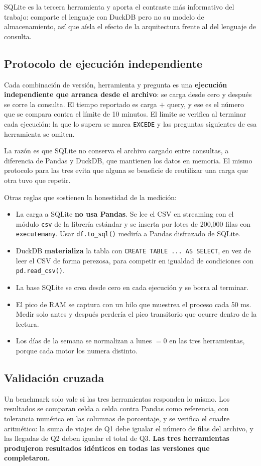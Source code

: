 SQLite es la tercera herramienta y aporta el contraste más informativo del trabajo: comparte el lenguaje con DuckDB pero no su modelo de almacenamiento, así que aísla el efecto de la arquitectura frente al del lenguaje de consulta.

\subsection{Protocolo de ejecución independiente}

Cada combinación de versión, herramienta y pregunta es una \textbf{ejecución independiente que arranca desde el archivo}: se carga desde cero y después se corre la consulta. El tiempo reportado es carga $+$ query, y ese es el número que se compara contra el límite de 10 minutos. El límite se verifica al terminar cada ejecución: la que lo supera se marca \texttt{EXCEDE} y las preguntas siguientes de esa herramienta se omiten.

La razón es que SQLite no conserva el archivo cargado entre consultas, a diferencia de Pandas y DuckDB, que mantienen los datos en memoria. El mismo protocolo para las tres evita que alguna se beneficie de reutilizar una carga que otra tuvo que repetir.

Otras reglas que sostienen la honestidad de la medición:

\begin{itemize}
  \item La carga a SQLite \textbf{no usa Pandas}. Se lee el CSV en streaming con el módulo \texttt{csv} de la librería estándar y se inserta por lotes de 200,000 filas con \texttt{executemany}. Usar \texttt{df.to\_sql()} mediría a Pandas disfrazado de SQLite.
  \item DuckDB \textbf{materializa} la tabla con \texttt{CREATE TABLE ... AS SELECT}, en vez de leer el CSV de forma perezosa, para competir en igualdad de condiciones con \texttt{pd.read\_csv()}.
  \item La base SQLite se crea desde cero en cada ejecución y se borra al terminar.
  \item El pico de RAM se captura con un hilo que muestrea el proceso cada 50 ms. Medir solo antes y después perdería el pico transitorio que ocurre dentro de la lectura.
  \item Los días de la semana se normalizan a lunes $=0$ en las tres herramientas, porque cada motor los numera distinto.
\end{itemize}

\subsection{Validación cruzada}

Un benchmark solo vale si las tres herramientas responden lo mismo. Los resultados se comparan celda a celda contra Pandas como referencia, con tolerancia numérica en las columnas de porcentaje, y se verifica el cuadre aritmético: la suma de viajes de Q1 debe igualar el número de filas del archivo, y las llegadas de Q2 deben igualar el total de Q3. \textbf{Las tres herramientas produjeron resultados idénticos en todas las versiones que completaron.}
